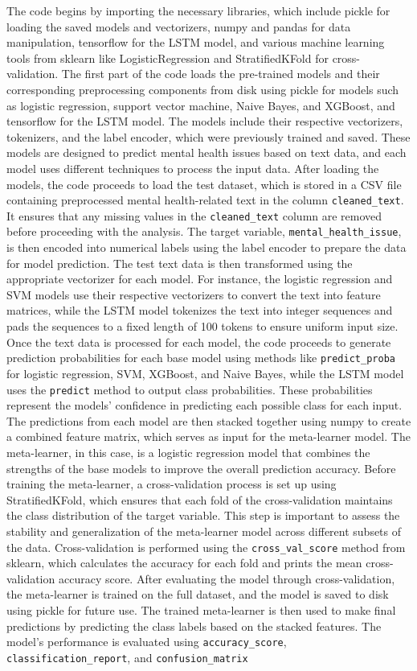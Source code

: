 \noindent
The code begins by importing the necessary libraries, which include pickle for loading the saved models and vectorizers, numpy and pandas for data manipulation, tensorflow for the LSTM model, and various machine learning tools from sklearn like LogisticRegression and StratifiedKFold for cross-validation. The first part of the code loads the pre-trained models and their corresponding preprocessing components from disk using pickle for models such as logistic regression, support vector machine, Naive Bayes, and XGBoost, and tensorflow for the LSTM model. The models include their respective vectorizers, tokenizers, and the label encoder, which were previously trained and saved. These models are designed to predict mental health issues based on text data, and each model uses different techniques to process the input data. After loading the models, the code proceeds to load the test dataset, which is stored in a CSV file containing preprocessed mental health-related text in the column \texttt{cleaned\_text}. It ensures that any missing values in the \texttt{cleaned\_text} column are removed before proceeding with the analysis. The target variable, \texttt{mental\_health\_issue}, is then encoded into numerical labels using the label encoder to prepare the data for model prediction. The test text data is then transformed using the appropriate vectorizer for each model. For instance, the logistic regression and SVM models use their respective vectorizers to convert the text into feature matrices, while the LSTM model tokenizes the text into integer sequences and pads the sequences to a fixed length of 100 tokens to ensure uniform input size. Once the text data is processed for each model, the code proceeds to generate prediction probabilities for each base model using methods like \texttt{predict\_proba} for logistic regression, SVM, XGBoost, and Naive Bayes, while the LSTM model uses the \texttt{predict} method to output class probabilities. These probabilities represent the models’ confidence in predicting each possible class for each input. The predictions from each model are then stacked together using numpy to create a combined feature matrix, which serves as input for the meta-learner model. The meta-learner, in this case, is a logistic regression model that combines the strengths of the base models to improve the overall prediction accuracy. Before training the meta-learner, a cross-validation process is set up using StratifiedKFold, which ensures that each fold of the cross-validation maintains the class distribution of the target variable. This step is important to assess the stability and generalization of the meta-learner model across different subsets of the data. Cross-validation is performed using the \texttt{cross\_val\_score} method from sklearn, which calculates the accuracy for each fold and prints the mean cross-validation accuracy score. After evaluating the model through cross-validation, the meta-learner is trained on the full dataset, and the model is saved to disk using pickle for future use. The trained meta-learner is then used to make final predictions by predicting the class labels based on the stacked features. The model's performance is evaluated using \texttt{accuracy\_score}, \texttt{classification\_report}, and \texttt{confusion\_matrix} 